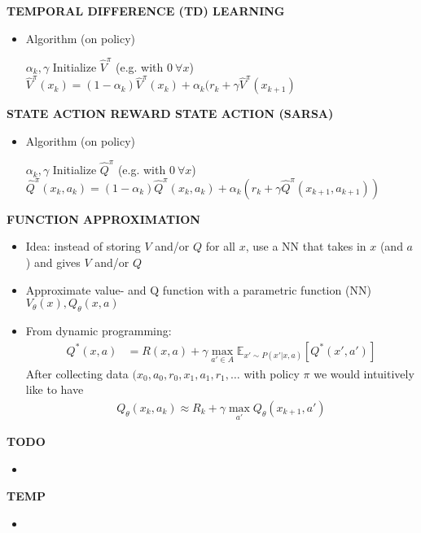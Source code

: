 \begin{whitebox}{\textbf{TEMPORAL DIFFERENCE (TD) LEARNING}}
    \begin{itemize}
        \item Algorithm (on policy)
        \begin{algorithmic}
            \Require $\alpha_k,\gamma$
            \State Initialize $\hat{V}^\pi$ (e.g. with $0\ \forall x$)
            \State $\hat{V}^\pi(x_k)=(1-\alpha_k)\hat{V}^\pi(x_k)+\alpha_k(r_k+\gamma\hat{V}^\pi(x_{k+1})$
            \EndFor
        \end{algorithmic}
    \end{itemize}
\end{whitebox}

\begin{whitebox}{\textbf{STATE ACTION REWARD STATE ACTION (SARSA)}}
    \begin{itemize}
        \item Algorithm (on policy)
        \begin{algorithmic}
            \footnotesize
            \Require $\alpha_k,\gamma$
            \State Initialize $\hat{Q}^\pi$ (e.g. with $0\ \forall x$)
            \State $\hat{Q}^\pi(x_k,a_k)=(1-\alpha_k)\hat{Q}^\pi(x_k,a_k)+\alpha_k\left(r_k+\gamma\hat{Q}^\pi(x_{k+1},a_{k+1})\right)$
            \EndFor
        \end{algorithmic}
    \end{itemize}
\end{whitebox}

\begin{whitebox}{\textbf{FUNCTION APPROXIMATION}}
    \begin{itemize}
        \item Idea: instead of storing $V$ and/or $Q$ for all $x$, use a NN that takes in $x$ (and $a$) and gives $V$ and/or $Q$
        \item Approximate value- and Q function with a parametric function (NN) $V_\theta(x),Q_\theta(x,a)$
        \item From dynamic programming:
        \begin{align*}
            Q^*(x,a)&=R(x,a)+\gamma\max_{a'\in A}\mathbb{E}_{x'\sim P(x'|x,a)}[Q^*(x',a')]
        \end{align*}
        After collecting data $(x_0,a_0,r_0,x_1,a_1,r_1,\dots$ with policy $\pi$ we would intuitively like to have
        \begin{align*}
            Q_\theta(x_k,a_k)\approx R_k+\gamma\max_{a'}Q_\theta(x_{k+1},a')
        \end{align*}
    \end{itemize}
\end{whitebox}

\begin{whitebox}{\textbf{TODO}}
    \begin{itemize}
        \item 
    \end{itemize}
\end{whitebox}

\begin{whitebox}{\textbf{TEMP}}
    \begin{itemize}
        \item 
    \end{itemize}
\end{whitebox}